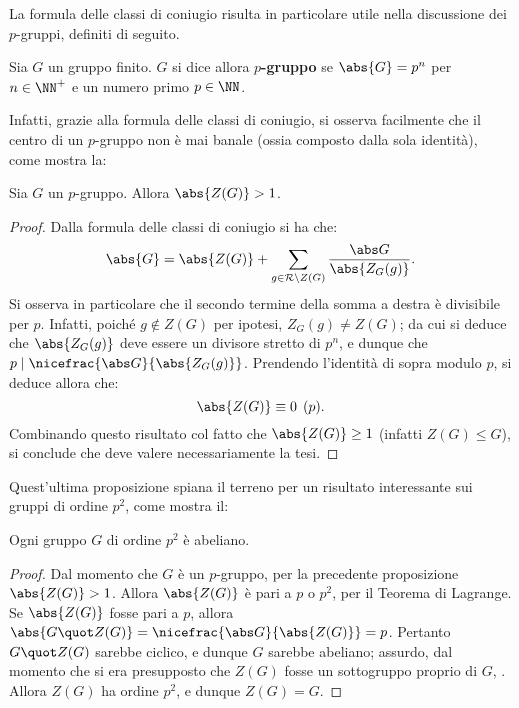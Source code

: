 \documentclass[12pt]{scrartcl}
\begin{document}
	
	La formula delle classi di coniugio risulta in particolare utile nella discussione
	dei $p$-gruppi, definiti di seguito.
	
	\begin{definition}[$p$-gruppo]
		Sia $G$ un gruppo finito. $G$ si dice allora \textbf{$p$-gruppo} se
		$\abs{G} = p^n$ per $n \in \NN^+$ e un numero primo $p \in \NN$.
	\end{definition}
	
	Infatti, grazie alla formula delle classi di coniugio, si osserva facilmente che il centro di un $p$-gruppo non è mai banale (ossia composto dalla sola identità), come mostra la:
	
	\begin{proposition}
		Sia $G$ un $p$-gruppo. Allora $\abs{Z(G)} > 1$. 
	\end{proposition}
	
	\begin{proof}
		Dalla formula delle classi di coniugio si ha che:
		\[ \abs{G} = \abs{Z(G)} + \sum_{g \in \mathcal{R} \setminus Z(G)} \frac{\abs G}{\abs{Z_G(g)}}. \]
		Si osserva in particolare che il secondo termine della somma a destra è divisibile
		per $p$. Infatti, poiché $g \notin Z(G)$ per ipotesi, $Z_G(g) \neq Z(G)$; da cui
		si deduce che $\abs{Z_G(g)}$ deve essere un divisore stretto di $p^n$, e dunque
		che $p \mid \nicefrac{\abs G}{\abs{Z_G(g)}}$. Prendendo l'identità di sopra modulo
		$p$, si deduce allora che:
		\[ \abs{Z(G)} \equiv 0 \pod p. \]
		Combinando questo risultato col fatto che $\abs{Z(G)} \geq 1$ (infatti $Z(G) \leq G$),
		si conclude che deve valere necessariamente la tesi.
	\end{proof} \medskip
	
	
	Quest'ultima proposizione spiana il terreno per un risultato interessante sui
	gruppi di ordine $p^2$, come mostra il:
	
	\begin{theorem}
		Ogni gruppo $G$ di ordine $p^2$ è abeliano.
	\end{theorem}
	
	\begin{proof}
		Dal momento che $G$ è un $p$-gruppo, per la precedente proposizione
		$\abs{Z(G)} > 1$. Allora $\abs{Z(G)}$ è pari a $p$ o $p^2$, per il
		Teorema di Lagrange. Se $\abs{Z(G)}$ fosse pari a $p$, allora
		$\abs{G \quot Z(G)} = \nicefrac{\abs G}{\abs{Z(G)}} = p$. Pertanto
		$G \quot Z(G)$ sarebbe ciclico, e dunque $G$ sarebbe abeliano; assurdo,
		dal momento che si era presupposto che $Z(G)$ fosse un sottogruppo proprio
		di $G$, \Lightning. Allora $Z(G)$ ha ordine $p^2$,
		e dunque $Z(G) = G$.
	\end{proof} \medskip
	
\end{document}
